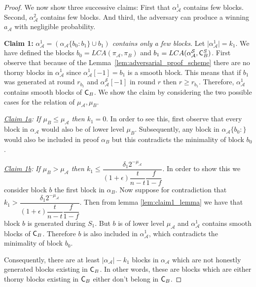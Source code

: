 \begin{proof}
We now show three successive claims: First that $\alpha_\mathcal{A}^1$ contains few blocks. Second, $\alpha_\mathcal{A}^2$ contains few blocks. And third, the adversary can produce a winning $a_\mathcal{A}$ with negligible probability.

\textbf{Claim 1:} \textit{$\alpha_\mathcal{A}^1 = (\alpha_\mathcal{A}\{b_0 : b_1\} \cup b_1)$ contains only a few blocks.} Let $\lvert \alpha^1_\mathcal{A} \rvert = k_1$. We have defined the blocks $b_0 = LCA(\pi_\mathcal{A}, \pi_B)$ and $b_1 = LCA(\alpha^{\mathcal{S}}_\mathcal{A}, \mathsf{C}^S_B)$. First observe that because of the Lemma~\ref{lem:adversarial_proof_scheme} there are no thorny blocks in $\alpha_\mathcal{A}^1$ since $\alpha_\mathcal{A}^1[-1] = b_1$ is a smooth block. This means that if $b_1$ was generated at round $r_{b_1}$ and $\alpha^{\mathcal{S}}_\mathcal{A}[-1]$ in round $r$ then $r \geq r_{b_1}$. Therefore, $\alpha_\mathcal{A}^1$ contains smooth blocks of $\mathsf{C}_B$. We show the claim by considering the two possible cases for the relation of $\mu_\mathcal{A}, \mu_B$.

\textit{\underline{Claim 1a}:} \textit{If $\mu_B \leq \mu_\mathcal{A}$ then $k_1 = 0$}. In order to see this, first observe that every block in $\alpha_\mathcal{A}$ would also be of lower level $\mu_B$. Subsequently, any block in $\alpha_\mathcal{\mathcal{A}}\{b_0{:}\}$ would also be included in proof $\alpha_B$ but this contradicts the minimality of block $b_0$.

\textit{\underline{Claim 1b}:} \textit{If $\mu_B > \mu_\mathcal{A}$ then $k_1 \leq \dfrac{\delta_1 2^{-\mu_\mathcal{A}}}{(1+\epsilon)\dfrac{t}{n-t}\dfrac{f}{1-f}}$}. In order to show this we consider block $b$ the first block in $\alpha_B$. Now suppose for contradiction that $k_1 > \dfrac{\delta_1 2^{-\mu_\mathcal{A}}}{(1+\epsilon)\dfrac{t}{n-t}\dfrac{f}{1-f}}$. Then from lemma \ref{lem:claim1_lemma} we have that block $b$ is generated during $S_1$. But $b$ is of lower level $\mu_\mathcal{A}$ and $\alpha^1_\mathcal{A}$ contains smooth blocks of $\mathsf{C}_B$. Therefore $b$ is also included in $\alpha^1_\mathcal{A}$, which contradicts the minimality of block $b_0$.

Consequently, there are at least $\lvert \alpha_\mathcal{A} \rvert - k_1$ blocks in $\alpha_\mathcal{A}$ which are not honestly generated blocks existing in $\mathsf{C}_B$. In other words, these are blocks which are either thorny blocks existing in $\mathsf{C}_B$ either don't belong in $\mathsf{C}_B$.


\end{proof}
